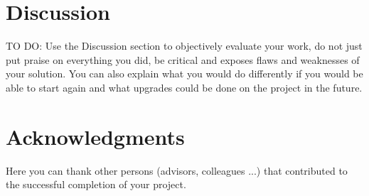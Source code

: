 \documentclass[fleqn,moreauthors,10pt]{ds_report}
\begin{document}

\section*{Discussion}

TO DO:
Use the Discussion section to objectively evaluate your work, do not just put praise on everything you did, be critical and exposes flaws and weaknesses of your solution. You can also explain what you would do differently if you would be able to start again and what upgrades could be done on the project in the future.



\section*{Acknowledgments}

Here you can thank other persons (advisors, colleagues ...) that contributed to the successful completion of your project.




\end{document}
